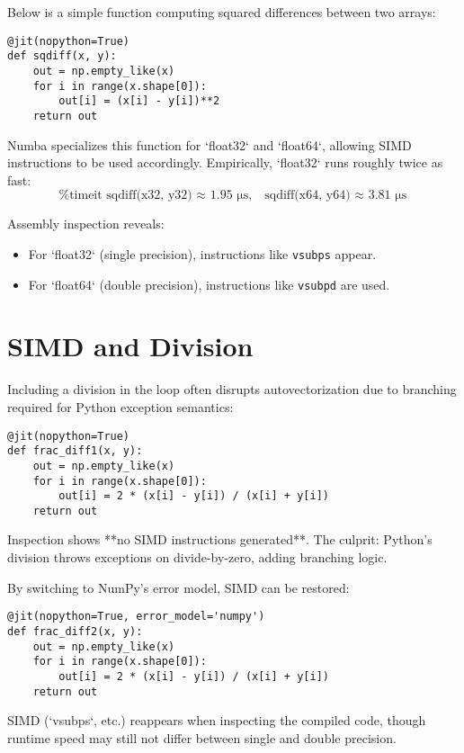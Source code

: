 \documentclass[11pt,a4paper]{book}
\begin{document}
Below is a simple function computing squared differences between two arrays:

\begin{lstlisting}
@jit(nopython=True)
def sqdiff(x, y):
    out = np.empty_like(x)
    for i in range(x.shape[0]):
        out[i] = (x[i] - y[i])**2
    return out
\end{lstlisting}

Numba specializes this function for `float32` and `float64`, allowing SIMD instructions to be used accordingly. Empirically, `float32` runs roughly twice as fast:
\[
\text{%
\]

Assembly inspection reveals:
\begin{itemize}
  \item For `float32` (single precision), instructions like \texttt{vsubps} appear.
  \item For `float64` (double precision), instructions like \texttt{vsubpd} are used.
\end{itemize}

\section{SIMD and Division}

Including a division in the loop often disrupts autovectorization due to branching required for Python exception semantics:

\begin{lstlisting}
@jit(nopython=True)
def frac_diff1(x, y):
    out = np.empty_like(x)
    for i in range(x.shape[0]):
        out[i] = 2 * (x[i] - y[i]) / (x[i] + y[i])
    return out
\end{lstlisting}

Inspection shows **no SIMD instructions generated**. The culprit: Python’s division throws exceptions on divide-by-zero, adding branching logic.

By switching to NumPy’s error model, SIMD can be restored:

\begin{lstlisting}
@jit(nopython=True, error_model='numpy')
def frac_diff2(x, y):
    out = np.empty_like(x)
    for i in range(x.shape[0]):
        out[i] = 2 * (x[i] - y[i]) / (x[i] + y[i])
    return out
\end{lstlisting}

SIMD (`vsubps`, etc.) reappears when inspecting the compiled code, though runtime speed may still not differ between single and double precision.
\end{document}
